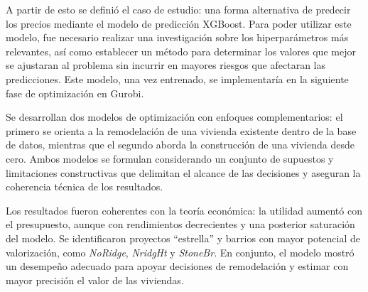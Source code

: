 A partir de esto se definió el caso de estudio: una forma alternativa de predecir los precios mediante el modelo de predicción XGBoost. Para poder utilizar este modelo, fue necesario realizar una investigación sobre los hiperparámetros más relevantes, así como establecer un método para determinar los valores que mejor se ajustaran al problema sin incurrir en mayores riesgos que afectaran las predicciones. Este modelo, una vez entrenado, se implementaría en la siguiente fase de optimización en Gurobi.


Se desarrollan dos modelos de optimización con enfoques complementarios: el primero se orienta a la remodelación de una vivienda existente dentro de la base de datos, mientras que el segundo aborda la construcción de una vivienda desde cero. Ambos modelos se formulan considerando un conjunto de supuestos y limitaciones constructivas que delimitan el alcance de las decisiones y aseguran la coherencia técnica de los resultados.


Los resultados fueron coherentes con la teoría económica: la utilidad aumentó con el presupuesto, aunque con rendimientos decrecientes y una posterior saturación del modelo. Se identificaron proyectos “estrella” y barrios con mayor potencial de valorización, como \textit{NoRidge}, \textit{NridgHt} y \textit{StoneBr}. En conjunto, el modelo mostró un desempeño adecuado para apoyar decisiones de remodelación y estimar con mayor precisión el valor de las viviendas.

